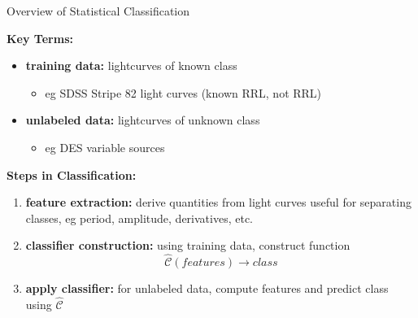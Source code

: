 \documentclass[12pt]{beamer}
\begin{document}
\begin{frame}{Overview of Statistical Classification}

\textbf{Key Terms:}
\begin{itemize}
\item \textbf{training data:} lightcurves of known class
  \begin{itemize}
  \item eg SDSS Stripe 82 light curves (known RRL, not RRL)
  \end{itemize}
\item \textbf{unlabeled data:} lightcurves of unknown class
  \begin{itemize}
  \item eg DES variable sources
  \end{itemize}
\end{itemize}

\vspace{.2in}

\textbf{Steps in Classification:}
\begin{enumerate}
\item \textbf{feature extraction:} derive quantities from light curves useful for separating classes, eg period, amplitude, derivatives, etc.
\item \textbf{classifier construction:} using training data, construct function
\begin{equation*}
\widehat{\mathcal{C}}(features) \rightarrow class
\end{equation*} 
\item \textbf{apply classifier:} for unlabeled data, compute features and predict class using $\widehat{\mathcal{C}}$
\end{enumerate}
\end{frame}
\end{document}
